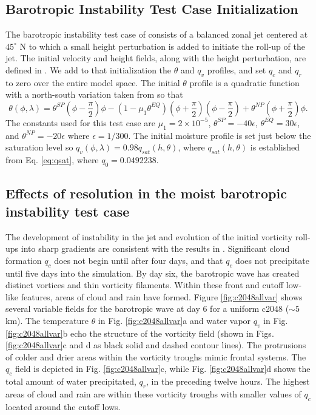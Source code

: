 \documentclass{ametsoc}
\begin{document}
\subsection{Barotropic Instability Test Case Initialization}
The barotropic instability test case of \cite{galewsky2004initial} 
consists of a balanced zonal jet centered at $45^\circ$ N to 
which a small height perturbation is added to initiate the roll-up
of the jet. The initial velocity and height fields, along with the height
perturbation, are defined in \cite{galewsky2004initial}.
We add to that initialization the
$\theta$ and $q_v$ profiles, and set $q_c$ and $q_r$ to zero over the entire model space.  
The initial $\theta$ profile is a quadratic function with a north-south variation
     taken from \cite{zerroukat2015moist} so that
   \begin{equation}
     \label{eq:pottemp}
     \theta(\phi, \lambda) = \theta^{SP}\left(\phi - \frac{\pi}{2}\right)\phi - 
     \left(1 - \mu_1 \theta^{EQ}\right)\left(\phi + \frac{\pi}{2}\right)\left(\phi - \frac{\pi}{2}\right)
     + \theta^{NP}\left(\phi + \frac{\pi}{2}\right)\phi.
   \end{equation}
The constants used for this test case are $\mu_1 = 2\times 10^{-5} $, 
$\theta^{SP}= -40\epsilon$, $\theta^{EQ}= 30\epsilon$,
and $\theta^{NP}= -20\epsilon$ where $\epsilon = 1 / 300$. The initial moisture profile 
is set just below the saturation level so $q_v(\phi, \lambda) = 0.98 q_{sat}(h, \theta)$, 
where $q_{sat}(h, \theta)$ is established from Eq. \ref{eq:qsat}, where $q_0 = 0.0492238$. 

\subsection{Effects of resolution in the moist barotropic instability test case}
The development of instability in the jet and evolution of the initial vorticity
roll-ups into sharp gradients are consistent with the results in \cite{galewsky2004initial}.
Significant cloud formation $q_c$ does not begin until after four days, and that $q_c$ 
does not precipitate until five days into the simulation. By day six, the barotropic
wave has created distinct vortices and thin vorticity filaments. Within these front and
cutoff low-like features, areas of cloud and rain have formed. Figure \ref{fig:c2048allvar}
shows several variable fields for the barotropic wave at day 6 for
a uniform c2048 ($\sim 5$ km). The 
temperature $\theta$ in Fig. \ref{fig:c2048allvar}a and water vapor $q_v$ in
Fig. \ref{fig:c2048allvar}b echo the structure of the vorticity field 
(shown in Figs. \ref{fig:c2048allvar}c and d as black solid and dashed contour lines).
The protrusions of colder and drier areas within the vorticity troughs mimic frontal
systems. The $q_c$ field is depicted in Fig. \ref{fig:c2048allvar}c, while
Fig. \ref{fig:c2048allvar}d shows the total amount of water precipitated, $q_r$, 
in the preceding twelve hours. The highest areas of cloud and rain are 
within these vorticity troughs with smaller values of $q_c$ located around
the cutoff lows.
\end{document}
